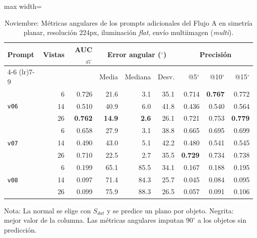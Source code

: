 \begin{table}[htbp]
\centering
\caption{Noviembre: Métricas angulares de los prompts adicionales del Flujo A en simetría planar, resolución 224px, iluminación \textit{flat}, envío multiimagen (\textit{multi}).}
\label{tab:nov_plane_adicionales_angular}
\begin{lrbox}{\tablebox}
\begin{adjustbox}{max width=\textwidth}
\begin{tabular}{lrrrrrrrr}
\toprule
\multirow{2}{*}{Prompt} & \multirow{2}{*}{Vistas} & \multirow{2}{*}{AUC$_{45^\circ}$} & \multicolumn{3}{c}{Error angular ($^\circ$)} & \multicolumn{3}{c}{Precisión} \\
\cmidrule(lr){4-6} \cmidrule(lr){7-9}
 &  &  & Media & Mediana & Desv. & @5$^\circ$ & @10$^\circ$ & @15$^\circ$ \\
\midrule
\multirow{3}{*}{\texttt{v06}} & 6 & 0.726 & 21.6 & 3.1 & 35.1 & 0.714 & \textbf{0.767} & 0.772 \\
 & 14 & 0.510 & 40.9 & 6.0 & 41.8 & 0.436 & 0.540 & 0.564 \\
 & 26 & \textbf{0.762} & \textbf{14.9} & \textbf{2.6} & 26.1 & 0.721 & 0.753 & \textbf{0.779} \\
\midrule
\multirow{3}{*}{\texttt{v07}} & 6 & 0.658 & 27.9 & 3.1 & 38.8 & 0.665 & 0.695 & 0.699 \\
 & 14 & 0.490 & 43.0 & 5.1 & 42.2 & 0.480 & 0.541 & 0.545 \\
 & 26 & 0.710 & 22.5 & 2.7 & 35.5 & \textbf{0.729} & 0.734 & 0.738 \\
\midrule
\multirow{3}{*}{\texttt{v08}} & 6 & 0.199 & 65.1 & 85.5 & 34.1 & 0.167 & 0.188 & 0.195 \\
 & 14 & 0.097 & 71.4 & 84.3 & 25.7 & 0.045 & 0.084 & 0.095 \\
 & 26 & 0.099 & 75.9 & 88.3 & 26.5 & 0.057 & 0.091 & 0.106 \\
\bottomrule
\end{tabular}
\end{adjustbox}
\end{lrbox}
\usebox{\tablebox}

\vspace{1.5ex}
\begin{minipage}{\wd\tablebox}
\footnotesize
Nota: La normal se elige con $S_{dat}$ y se predice un plano por objeto. Negrita: mejor valor de la columna. Las métricas angulares imputan $90^\circ$ a los objetos sin predicción.
\end{minipage}
\end{table}

